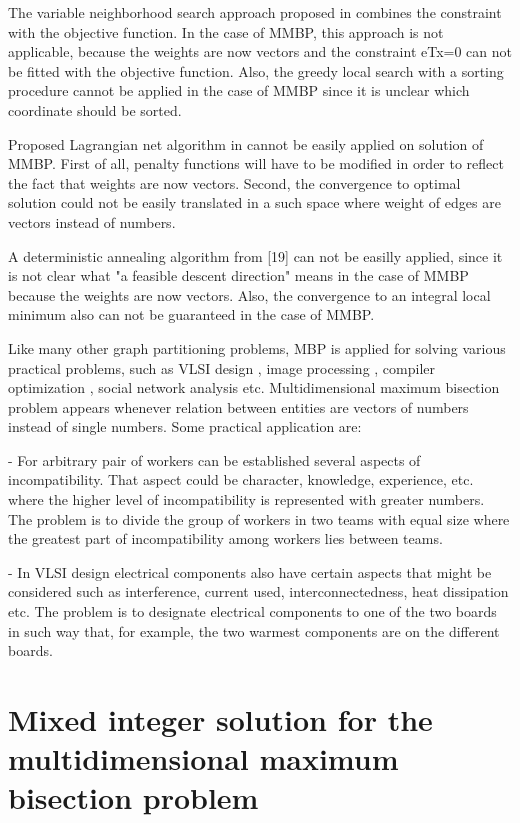 \documentclass[10pt]{article}
\begin{document}
The variable neighborhood search approach proposed in \cite{ling} combines the constraint  with the objective function. In the case of MMBP, this approach is not applicable, because the weights are now vectors and the constraint eTx=0 can not be fitted with the objective function.
Also, the greedy local search with a sorting procedure cannot be applied in the case of MMBP since it is unclear which coordinate should be sorted.
 

Proposed Lagrangian net algorithm in \cite{fengmin} cannot be easily applied on solution
of MMBP. First of all, penalty functions will have to be modified in order to reflect the fact that 
weights are now vectors. Second, the convergence to optimal solution could not be easily translated 
in a such space where weight of edges are vectors instead of numbers. 


A deterministic annealing algorithm from [19] can not be easilly applied, since it is not clear what "a feasible descent direction" means in the case of MMBP because the weights are now vectors. Also, the convergence to an integral local minimum also can not be guaranteed in the case of MMBP.

Like many other graph partitioning problems, MBP is applied for solving various practical problems, such as VLSI design \cite{slov}, image processing \cite{shij},  compiler optimization \cite{hand}, social network analysis etc. 
Multidimensional maximum bisection problem appears whenever relation between entities are vectors of numbers instead of single numbers.
Some practical application are:

- For arbitrary pair of workers can be established several aspects of incompatibility. That aspect could be character, knowledge, experience, etc. where the higher level of incompatibility is represented with greater numbers. The problem is to divide the group of workers in two teams with equal size where the greatest part of incompatibility among workers lies between teams. 

- In VLSI design electrical components also have certain aspects that might be considered such as interference, current used, interconnectedness, heat dissipation etc. The problem is to designate electrical components to one of the two boards in such way that, for example, the two warmest components are on the different boards. 


\section{Mixed integer solution for the multidimensional maximum bisection problem}
\end{document}
